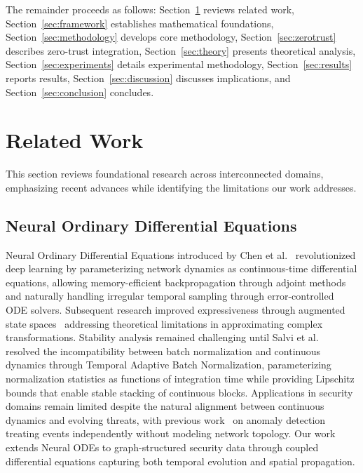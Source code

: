 \documentclass[lettersize,journal]{IEEEtran}
\begin{document}
The remainder proceeds as follows: Section~\ref{sec:related} reviews related work, Section~\ref{sec:framework} establishes mathematical foundations, Section~\ref{sec:methodology} develops core methodology, Section~\ref{sec:zerotrust} describes zero-trust integration, Section~\ref{sec:theory} presents theoretical analysis, Section~\ref{sec:experiments} details experimental methodology, Section~\ref{sec:results} reports results, Section~\ref{sec:discussion} discusses implications, and Section~\ref{sec:conclusion} concludes.
\section{Related Work}
\label{sec:related}

This section reviews foundational research across interconnected domains, emphasizing recent advances while identifying the limitations our work addresses.

\subsection{Neural Ordinary Differential Equations}

Neural Ordinary Differential Equations introduced by Chen et al.~\cite{chen2018neural} revolutionized deep learning by parameterizing network dynamics as continuous-time differential equations, allowing memory-efficient backpropagation through adjoint methods~\cite{pontryagin1962mathematical} and naturally handling irregular temporal sampling through error-controlled ODE solvers. Subsequent research improved expressiveness through augmented state spaces~\cite{dupont2019augmented} addressing theoretical limitations in approximating complex transformations. Stability analysis remained challenging until Salvi et al.~\cite{salvi2024tabn} resolved the incompatibility between batch normalization and continuous dynamics through Temporal Adaptive Batch Normalization, parameterizing normalization statistics as functions of integration time while providing Lipschitz bounds that enable stable stacking of continuous blocks. Applications in security domains remain limited despite the natural alignment between continuous dynamics and evolving threats, with previous work~\cite{onken2021ot} on anomaly detection treating events independently without modeling network topology. Our work extends Neural ODEs to graph-structured security data through coupled differential equations capturing both temporal evolution and spatial propagation.
\end{document}
